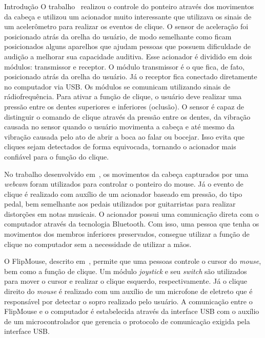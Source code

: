 \begin{chapter}{Introdução}
O trabalho~\cite{Simpson08} realizou o controle do ponteiro através dos
movimentos da cabeça e utilizou um acionador muito interessante que
utilizava os sinais de um acelerômetro para realizar os eventos de clique. O
sensor de aceleração foi posicionado atrás da orelha do usuário, de modo
semelhante como ficam posicionados alguns aparelhos que ajudam pessoas que
possuem dificuldade de audição a melhorar sua capacidade auditiva. Esse
acionador é dividido em dois módulos: transmissor e receptor. O módulo
transmissor é o que fica, de fato, posicionado atrás da orelha do usuário. Já o
receptor fica conectado diretamente no computador via USB. Os módulos se
comunicam utilizando sinais de rádiofrequência. Para ativar a função de clique,
o usuário deve realizar uma pressão entre os dentes superiores e inferiores
(oclusão).  O sensor é capaz de distinguir o comando de clique através da
pressão entre os dentes, da vibração causada no sensor quando o usuário
movimenta a cabeça e até mesmo da vibração causada pelo ato de abrir a boca ao
falar ou bocejar. Isso evita que cliques sejam detectados de forma equivocada,
tornando o acionador mais confiável para o função do clique.

No trabalho desenvolvido em~\cite{Antunes16}, os movimentos da cabeça capturados
por uma \textit{webcam} foram utilizados para controlar o ponteiro do mouse. Já
o evento de clique é realizado com auxílio de um acionador baseado em pressão,
do tipo pedal, bem semelhante aos pedais utilizados por guitarristas para
realizar distorções em notas musicais. O acionador possui uma comunicação direta
com o computador através da tecnologia Bluetooth. Com isso, uma pessoa que tenha
os movimentos dos membros inferiores preservados, consegue utilizar a função de
clique no computador sem a necessidade de utilizar a mãos. 

O FlipMouse, descrito em~\cite{Aigner16}, permite que uma pessoas controle o
cursor do \textit{mouse}, bem como a função de clique. Um módulo
\textit{joystick} e seu \textit{switch} são utilizados para mover o cursor e 
realizar o clique esquerdo, respectivamente. Já o clique direito do
\textit{mouse} é realizado com um auxílio de um microfone de eletreto que é
responsável por detectar o sopro realizado pelo usuário. A comunicação entre o
FlipMouse e o computador é estabelecida através da interface USB com o auxílio
de um microcontrolador que gerencia o protocolo de comunicação exigida pela
interface USB.


\end{chapter}
